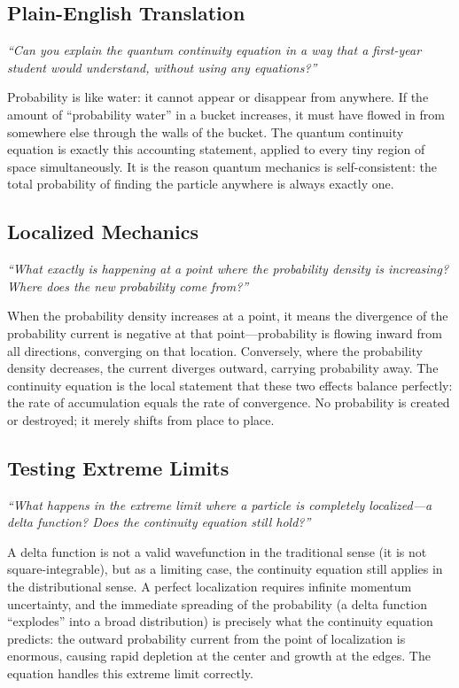 \documentclass[11pt,openright]{book}
\begin{document}
\subsection*{Plain-English Translation}
\textit{``Can you explain the quantum continuity equation in a way that a first-year student would understand, without using any equations?''}

Probability is like water: it cannot appear or disappear from anywhere. If the amount of ``probability water'' in a bucket increases, it must have flowed in from somewhere else through the walls of the bucket. The quantum continuity equation is exactly this accounting statement, applied to every tiny region of space simultaneously. It is the reason quantum mechanics is self-consistent: the total probability of finding the particle anywhere is always exactly one.

\subsection*{Localized Mechanics}
\textit{``What exactly is happening at a point where the probability density is increasing? Where does the new probability come from?''}

When the probability density increases at a point, it means the divergence of the probability current is negative at that point---probability is flowing inward from all directions, converging on that location. Conversely, where the probability density decreases, the current diverges outward, carrying probability away. The continuity equation is the local statement that these two effects balance perfectly: the rate of accumulation equals the rate of convergence. No probability is created or destroyed; it merely shifts from place to place.

\subsection*{Testing Extreme Limits}
\textit{``What happens in the extreme limit where a particle is completely localized---a delta function? Does the continuity equation still hold?''}

A delta function is not a valid wavefunction in the traditional sense (it is not square-integrable), but as a limiting case, the continuity equation still applies in the distributional sense. A perfect localization requires infinite momentum uncertainty, and the immediate spreading of the probability (a delta function ``explodes'' into a broad distribution) is precisely what the continuity equation predicts: the outward probability current from the point of localization is enormous, causing rapid depletion at the center and growth at the edges. The equation handles this extreme limit correctly.
\end{document}
